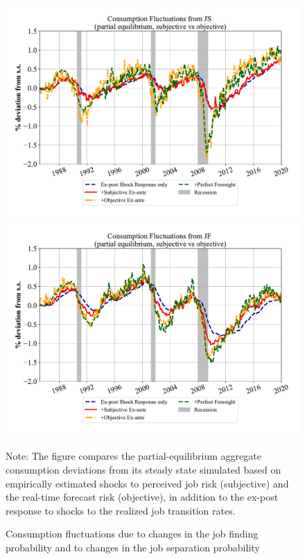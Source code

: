 \begin{figure}[ht]
    \centering
    \caption{Consumption fluctuations due to changes in the job finding probability and to changes in the job separation probability}
    \label{fig:pe_decompose_sub_obj}
\includegraphics[width=0.87\linewidth]{text/chapter2/Figures/consumption_pe_JS_deviation_machine_as_rational_monthly.pdf} \\
\vspace{-2em}
\includegraphics[width=0.87\linewidth]{text/chapter2/Figures/consumption_pe_JF_deviation_machine_as_rational_monthly.pdf} \\
\vspace{-2em}
	\begin{flushleft}\footnotesize {Note: The figure compares the partial-equilibrium aggregate consumption deviations from its steady state simulated based on empirically estimated shocks to perceived job risk (subjective) and the real-time forecast risk (objective), in addition to the ex-post response to shocks to the realized job transition rates.} \end{flushleft}
\end{figure}


